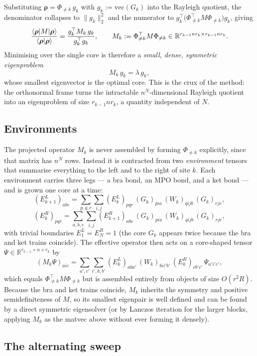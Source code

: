 \documentclass[12pt]{article}
\newcommand{\R}{\mathbb{R}}
\newcommand{\brho}{\boldsymbol{\rho}}
\theoremstyle{definition}
\theoremstyle{remark}
\begin{document}
Substituting $\brho = \Phi_{\neq k}\, g_k$ with $g_k := \mathrm{vec}(G_k)$ into the Rayleigh quotient, the denominator collapses to $\|g_k\|_2^2$ and the numerator to $g_k^\top \big(\Phi_{\neq k}^\top M \Phi_{\neq k}\big) g_k$, giving
\[
\frac{\braket{\brho | M | \brho}}{\braket{\brho | \brho}}
= \frac{g_k^\top M_k\, g_k}{g_k^\top g_k},
\qquad
M_k := \Phi_{\neq k}^\top M \Phi_{\neq k}
\in \R^{r_{k-1} n r_k \times r_{k-1} n r_k}.
\]
Minimising over the single core is therefore a \emph{small, dense, symmetric eigenproblem}
\[
M_k\, g_k = \lambda\, g_k,
\]
whose smallest eigenvector is the optimal core. This is the crux of the method: the orthonormal frame turns the intractable $n^N$-dimensional Rayleigh quotient into an eigenproblem of size $r_{k-1} n r_k$, a quantity independent of $N$.

\subsection{Environments}\label{sec:environments}

The projected operator $M_k$ is never assembled by forming $\Phi_{\neq k}$ explicitly, since that matrix has $n^N$ rows. Instead it is contracted from two \emph{environment} tensors that summarise everything to the left and to the right of site $k$. Each environment carries three legs --- a bra bond, an MPO bond, and a ket bond --- and is grown one core at a time:
\[
(E^L_{k+1})_{abe}
= \sum_{p,q,r} \sum_{i,j}
  (E^L_k)_{pqr}\, (G_k)_{pia}\, (W_k)_{qijb}\, (G_k)_{rje},
\]
\[
(E^R_{k})_{pqr}
= \sum_{a,b,e} \sum_{i,j}
  (E^R_{k+1})_{abe}\, (G_k)_{pia}\, (W_k)_{qijb}\, (G_k)_{rje},
\]
with trivial boundaries $E^L_1 = E^R_N = 1$ (the core $G_k$ appears twice because the bra and ket trains coincide). The effective operator then acts on a core-shaped tensor $\Psi \in \R^{r_{k-1} \times n \times r_k}$ by
\[
(M_k \Psi)_{aic}
= \sum_{a',c'} \sum_{i',b,b'}
  (E^L_k)_{aba'}\, (W_k)_{bii'b'}\, (E^R_k)_{cb'c'}\, \Psi_{a'i'c'},
\]
which equals $\Phi_{\neq k}^\top M \Phi_{\neq k}$ but is assembled entirely from objects of size $O(r^2 R)$. Because the bra and ket trains coincide, $M_k$ inherits the symmetry and positive semidefiniteness of $M$, so its smallest eigenpair is well defined and can be found by a direct symmetric eigensolver (or by Lanczos iteration for the larger blocks, applying $M_k$ as the matvec above without ever forming it densely).

\subsection{The alternating sweep}\label{sec:sweep}
\end{document}
